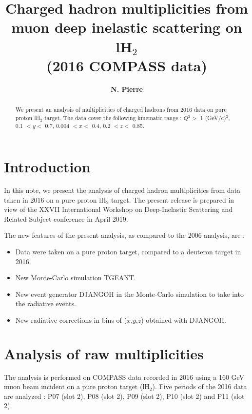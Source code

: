 \documentclass[letterpaper,12pt]{article}
\begin{document}
\title{\textbf{Charged hadron multiplicities from muon deep inelastic scattering on lH$_2$ \\ (2016 COMPASS data)}}
\author[1,2]{\textbf{N. Pierre}}
\maketitle

\begin{abstract}
  We present an analysis of multiplicities of charged hadrons from 2016 data on pure proton lH$_2$ target.
  The data cover the following kinematic range : $Q^2 >$ 1 (GeV/c)$^2$, 0.1 $< y <$ 0.7, 0.004 $< x <$ 0.4,
  0.2 $< z <$ 0.85.
\end{abstract}

\newpage

\section{Introduction} \label{Intro}

In this note, we present the analysis of charged hadron multiplicities from data taken in 2016 on a pure proton lH$_2$ target.
The present release is prepared in view of the XXVII International Workshop on Deep-Inelastic Scattering and Related Subject
conference in April 2019.

The new features of the present analysis, as compared to the 2006 analysis, are :
\begin{itemize}
	\item Data were taken on a pure proton target, compared to a deuteron target in 2016.
	\item New Monte-Carlo simulation TGEANT.
	\item New event generator DJANGOH in the Monte-Carlo simulation to take into the radiative events.
	\item New radiative corrections in bins of ($x$,$y$,$z$) obtained with DJANGOH.
\end{itemize}

\section{Analysis of raw multiplicities} \label{Raw}

The analysis is performed on COMPASS data recorded in 2016 using a 160 GeV muon beam incident on a pure proton target (lH$_2$).
Five periods of the 2016 data are analyzed : P07 (slot 2), P08 (slot 2), P09 (slot 2), P10 (slot 2) and P11 (slot 2).
\end{document}
